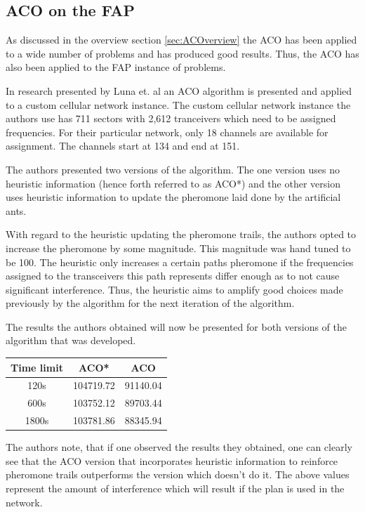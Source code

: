 \subsection{ACO on the FAP}
As discussed in the overview section \ref{sec:ACOverview} the ACO has been applied to a wide number of problems and has produced good results. Thus, the ACO has also been applied to the FAP instance of problems.

In research presented by Luna et. al\cite{ACOvsEA} an ACO algorithm is presented and applied to a custom cellular network instance. The custom cellular network instance the authors use has 711 sectors with 2,612 tranceivers which need to be assigned frequencies. For their particular network, only 18 channels are available for assignment. The channels start at 134 and end at 151\cite{ACOvsEA}.

The authors presented two versions of the algorithm. The one version uses no heuristic information (hence forth referred to as ACO*) and the other version uses heuristic information to update the pheromone laid done by the artificial ants\cite{ACOvsEA}.

With regard to the heuristic updating the pheromone trails, the authors opted to increase the pheromone by some magnitude\cite{ACOvsEA}. This magnitude was hand tuned to be 100. The heuristic only increases a certain paths pheromone if the frequencies assigned to the transceivers this path represents differ enough as to not cause significant interference\cite{ACOvsEA}. Thus, the heuristic aims to amplify good choices made previously by the algorithm for the next iteration of the algorithm.

The results the authors obtained will now be presented for both versions of the algorithm that was developed\cite{ACOvsEA}.

\begin{center}
	\begin{tabular}{| c | c | c |}
	\hline
	Time limit & ACO* & ACO \\ \hline
	120s & 104719.72 & 91140.04 \\ \hline
	600s & 103752.12 & 89703.44 \\ \hline
	1800s & 103781.86 & 88345.94 \\ \hline
	\end{tabular}
\end{center}

The authors note, that if one observed the results they obtained, one can clearly see that the ACO version that incorporates heuristic information to reinforce pheromone trails outperforms the version which doesn't do it\cite{ACOvsEA}. The above values represent the amount of interference which will result if the plan is used in the network\cite{ACOvsEA}.
